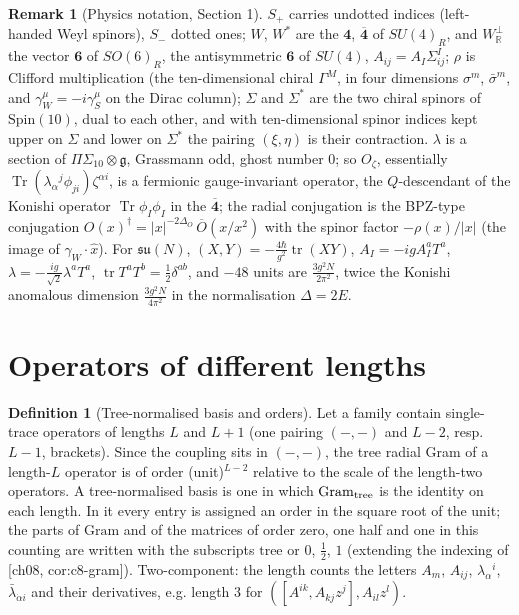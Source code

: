 \documentclass[11pt]{report}
\theoremstyle{plain}
\theoremstyle{definition}
\newtheorem{definition}[theorem]{Definition}
\newtheorem{remark}[theorem]{Remark}
\numberwithin{equation}{chapter}
\newcommand{\Wp}{W_{\mathbb R}^\perp}
\newcommand{\Gt}{\mathrm{Gram}_{\rm tree}}
\begin{document}
\begin{remark}[Physics notation, Section 1]
$S_+$ carries undotted indices (left-handed Weyl spinors), $S_-$ dotted ones; $W$, $W^*$ are the $\mathbf 4$, $\overline{\mathbf 4}$ of $SU(4)_R$, and $\Wp$ the vector $\mathbf 6$ of $SO(6)_R$, the antisymmetric $\mathbf 6$ of $SU(4)$, $A_{ij}=A_I\Sigma^I_{ij}$; $\rho$ is Clifford multiplication (the ten-dimensional chiral $\Gamma^M$, in four dimensions $\sigma^m$, $\bar\sigma^m$, and $\gamma_W^\mu=-i\gamma_S^\mu$ on the Dirac column); $\Sigma$ and $\Sigma^*$ are the two chiral spinors of $\mathrm{Spin}(10)$, dual to each other, and with ten-dimensional spinor indices kept upper on $\Sigma$ and lower on $\Sigma^*$ the pairing $(\xi,\eta)$ is their contraction. $\lambda$ is a section of $\Pi\Sigma_{10}\otimes\mathfrak g$, Grassmann odd, ghost number $0$; so $O_\zeta$, essentially $\operatorname{Tr}(\lambda_\alpha{}^j\phi_{ji})\zeta^{\alpha i}$, is a fermionic gauge-invariant operator, the $Q$-descendant of the Konishi operator $\operatorname{Tr}\phi_I\phi_I$ in the $\overline{\mathbf 4}$; the radial conjugation is the BPZ-type conjugation $O(x)^\dagger=|x|^{-2\Delta_O}\,\overline O(x/x^2)$ with the spinor factor $-\rho(x)/|x|$ (the image of $\gamma_W\cdot\hat x$). For $\mathfrak{su}(N)$, $(X,Y)=-\tfrac{4\hbar}{g^2}\operatorname{tr}(XY)$, $A_I=-igA_I^aT^a$, $\lambda=-\tfrac{ig}{\sqrt2}\lambda^aT^a$, $\operatorname{tr}T^aT^b=\tfrac12\delta^{ab}$, and $-48$ units are $\tfrac{3g^2N}{2\pi^2}$, twice the Konishi anomalous dimension $\tfrac{3g^2N}{4\pi^2}$ in the normalisation $\Delta=2E$.
\end{remark}

\section{Operators of different lengths}

\begin{definition}[Tree-normalised basis and orders]
\label{def:ip-normalised}
Let a family contain single-trace operators of lengths $L$ and $L+1$ (one pairing $(-,-)$ and $L-2$, resp. $L-1$, brackets). Since the coupling sits in $(-,-)$, the tree radial Gram of a length-$L$ operator is of order (unit)$^{L-2}$ relative to the scale of the length-two operators. A tree-normalised basis is one in which $\Gt$ is the identity on each length. In it every entry is assigned an order in the square root of the unit; the parts of $\mathrm{Gram}$ and of the matrices of order zero, one half and one in this counting are written with the subscripts $\mathrm{tree}$ or $0$, $\tfrac12$, $1$ (extending the indexing of [ch08, cor:c8-gram]). Two-component: the length counts the letters $A_m$, $A_{ij}$, $\lambda_\alpha{}^i$, $\bar\lambda_{\dot\alpha i}$ and their derivatives, e.g. length $3$ for $([A^{ik},A_{kj}z^j],A_{il}z^l)$.
\end{definition}
\end{document}
